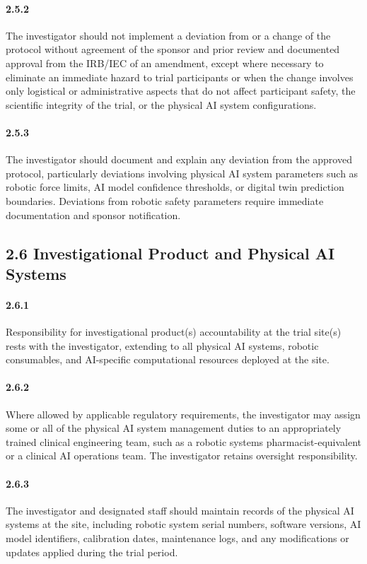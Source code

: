 \documentclass[11pt]{article}
\begin{document}
\paragraph{2.5.2} The investigator should not implement a deviation from or a change of the protocol without agreement of the sponsor and prior review and documented approval from the IRB/IEC of an amendment, except where necessary to eliminate an immediate hazard to trial participants or when the change involves only logistical or administrative aspects that do not affect participant safety, the scientific integrity of the trial, or the physical AI system configurations.

\paragraph{2.5.3} The investigator should document and explain any deviation from the approved protocol, particularly deviations involving physical AI system parameters such as robotic force limits, AI model confidence thresholds, or digital twin prediction boundaries. Deviations from robotic safety parameters require immediate documentation and sponsor notification.

\subsection{2.6 Investigational Product and Physical AI Systems}

\paragraph{2.6.1} Responsibility for investigational product(s) accountability at the trial site(s) rests with the investigator, extending to all physical AI systems, robotic consumables, and AI-specific computational resources deployed at the site.

\paragraph{2.6.2} Where allowed by applicable regulatory requirements, the investigator may assign some or all of the physical AI system management duties to an appropriately trained clinical engineering team, such as a robotic systems pharmacist-equivalent or a clinical AI operations team. The investigator retains oversight responsibility.

\paragraph{2.6.3} The investigator and designated staff should maintain records of the physical AI systems at the site, including robotic system serial numbers, software versions, AI model identifiers, calibration dates, maintenance logs, and any modifications or updates applied during the trial period.
\end{document}
